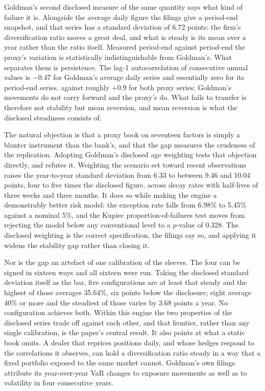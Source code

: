 Goldman's second disclosed measure of the same quantity says what kind of
failure it is. Alongside the average daily figure the filings give a period-end
snapshot, and that series has a standard deviation of 6.72 points: the firm's
diversification ratio moves a great deal, and what is steady is its mean over a
year rather than the ratio itself. Measured period-end against period-end the
proxy's variation is statistically indistinguishable from Goldman's. What
separates them is persistence. The lag-1 autocorrelation of consecutive annual
values is $-0.47$ for Goldman's average daily series and essentially zero for
its period-end series, against roughly $+0.9$ for both proxy series: Goldman's
movements do not carry forward and the proxy's do. What fails to transfer is
therefore not stability but mean reversion, and mean reversion is what the
disclosed steadiness consists of.

The natural objection is that a proxy book on seventeen factors is simply a
blunter instrument than the bank's, and that the gap measures the crudeness of
the replication. Adopting Goldman's disclosed age weighting tests that
objection directly, and refutes it. Weighting the scenario set toward recent
observations raises the year-to-year standard deviation from 6.33 to between
9.46 and 10.04 points, four to five times the disclosed figure, across decay
rates with half-lives of three weeks and three months. It does so while making
the engine a demonstrably better risk model: the exception rate falls from
6.98\% to 5.45\% against a nominal 5\%, and the Kupiec proportion-of-failures
test moves from rejecting the model below any conventional level to a $p$-value
of 0.328. The disclosed weighting is the correct specification, the filings say
so, and applying it widens the stability gap rather than closing it.

Nor is the gap an artefact of one calibration of the sleeves. The four can be
signed in sixteen ways and all sixteen were run. Taking the disclosed standard
deviation itself as the bar, five configurations are at least that steady and
the highest of those averages 35.64\%, six points below the disclosure; eight
average 40\% or more and the steadiest of those varies by 3.68 points a year.
No configuration achieves both. Within this engine the two properties of the
disclosed series trade off against each other, and that frontier, rather than
any single calibration, is the paper's central result. It also points at what a
static book omits. A dealer that reprices positions daily, and whose hedges
respond to the correlations it observes, can hold a diversification ratio
steady in a way that a fixed portfolio exposed to the same market cannot.
Goldman's own filings attribute its year-over-year VaR changes to exposure
movements as well as to volatility in four consecutive years.

